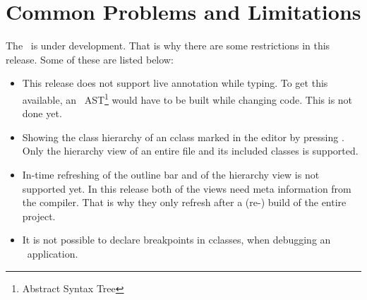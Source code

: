 \section{Common Problems and Limitations}
The \cjdt ~is under development. That is why there are some restrictions in this release. Some of these are listed below:
\begin{itemize}
	\item This release does not support live annotation while typing. To get this available, an \caesarj ~AST\footnote{Abstract Syntax Tree} would have to be built while changing code. This is not done yet.
	\item Showing the class hierarchy of an cclass marked in the editor by pressing . Only the hierarchy view of an entire file and its included classes is supported.
	\item In-time refreshing of the outline bar and of the hierarchy view is not supported yet. In this release both of the views need meta information from the compiler. That is why they only refresh after a (re-) build of the entire project.
	\item It is not possible to declare breakpoints in cclasses, when debugging an \caesarj ~application.
\end{itemize}
